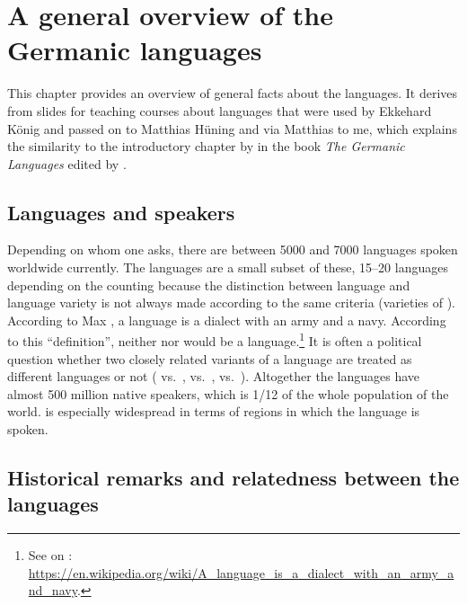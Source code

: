 \chapter{A general overview of the Germanic languages}

This chapter provides an overview of general facts about the  languages. It derives from
slides for teaching courses about  languages that were used by Ekkehard König and passed on
to Matthias Hüning and via Matthias to me, which explains the similarity to the introductory
chapter by \citet{HvDA94a} in the book \emph{The Germanic Languages} edited by \citet{KvdA94a-ed}.



\section{Languages and speakers}

Depending on whom one asks, there are between 5000 and 7000 languages spoken worldwide currently. The
 languages are a small subset of these, 15--20 languages depending on the counting because the distinction between language and language variety is not always made according to the same criteria (\eg varieties of ). 
According to Max \citet[]{Weinreich45a-u}, a language is a dialect with an army and a
navy. According to this ``definition'', neither  nor  would be a language.\footnote{%
See \citet[]{Weinreich45a-u} on : \url{https://en.wikipedia.org/wiki/A_language_is_a_dialect_with_an_army_and_navy}.
} 
It is often a political question whether two closely related variants of a language are treated as different languages or not ( vs.\ ,  vs.\ ,  vs.\ ).
Altogether the  languages have almost 500 million native speakers, which is 1/12 of the whole population of
the world.  is especially widespread in terms of regions in which the language is spoken.


\section{Historical remarks and relatedness between the languages}


